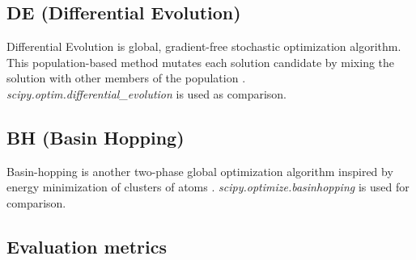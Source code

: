



%    

%    


\subsection{DE (Differential Evolution)}
\label{compare:de}

Differential Evolution is global, gradient-free stochastic optimization algorithm. This population-based method mutates
each solution candidate by mixing the solution with other members of the  population \cite{storn}.
\emph{scipy.optim.differential\_evolution} is used as comparison.

\subsection{BH (Basin Hopping)}
\label{compare:bh}

Basin-hopping is another two-phase global optimization algorithm inspired by energy minimization of clusters of atoms \cite{wales}.
\emph{scipy.optimize.basinhopping} is used for comparison.

\subsection{Evaluation metrics}

